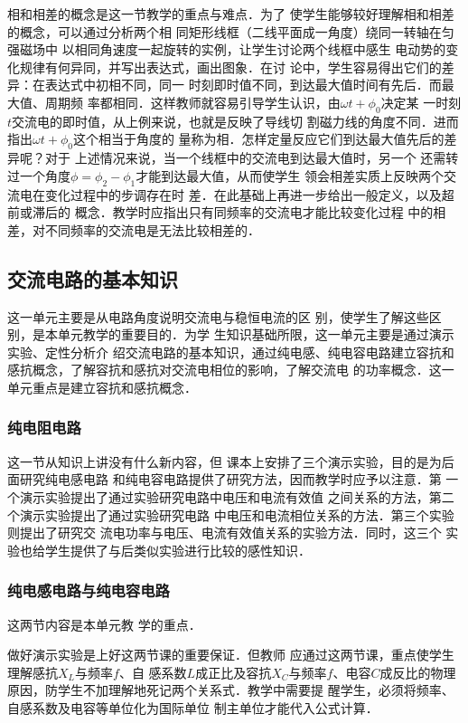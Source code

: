 相和相差的概念是这一节教学的重点与难点．为了
使学生能够较好理解相和相差的概念，可以通过分析两个相
同矩形线框（二线平面成一角度）绕同一转轴在匀强磁场中
以相同角速度一起旋转的实例，让学生讨论两个线框中感生
电动势的变化规律有何异同，并写出表达式，画出图象．在讨
论中，学生容易得出它们的差异：在表达式中初相不同，同一
时刻即时值不同，到达最大值时间有先后．而最大值、周期频
率都相同．这样教师就容易引导学生认识，由$\omega t+\phi_0$决定某
一时刻$t$交流电的即时值，从上例来说，也就是反映了导线切
割磁力线的角度不同．进而指出$\omega t+\phi_0$这个相当于角度的
量称为相．怎样定量反应它们到达最大值先后的差异呢？对于
上述情况来说，当一个线框中的交流电到达最大值时，另一个
还需转过一个角度$\phi=\phi_2-\phi_1$才能到达最大值，从而使学生
领会相差实质上反映两个交流电在变化过程中的步调存在时
差．在此基础上再进一步给出一般定义，以及超前或滞后的
概念．教学时应指出只有同频率的交流电才能比较变化过程
中的相差，对不同频率的交流电是无法比较相差的．


\subsection{交流电路的基本知识}
这一单元主要是从电路角度说明交流电与稳恒电流的区
别，使学生了解这些区别，是本单元教学的重要目的．为学
生知识基础所限，这一单元主要是通过演示实验、定性分析介
绍交流电路的基本知识，通过纯电感、纯电容电路建立容抗和
感抗概念，了解容抗和感抗对交流电相位的影响，了解交流电
的功率概念．这一单元重点是建立容抗和感抗概念．

\subsubsection{纯电阻电路}


 这一节从知识上讲没有什么新内容，但
课本上安排了三个演示实验，目的是为后面研究纯电感电路
和纯电容电路提供了研究方法，因而教学时应予以注意．第
一个演示实验提出了通过实验研究电路中电压和电流有效值
之间关系的方法，第二个演示实验提出了通过实验研究电路
中电压和电流相位关系的方法．第三个实验则提出了研究交
流电功率与电压、电流有效值关系的实验方法．同时，这三个
实验也给学生提供了与后类似实验进行比较的感性知识．

\subsubsection{纯电感电路与纯电容电路}

这两节内容是本单元教
学的重点．

做好演示实验是上好这两节课的重要保证．但教师
应通过这两节课，重点使学生理解感抗$X_L$与频率$f$、自
感系数$L$成正比及容抗$X_C$与频率$f$、电容$C$成反比的物理
原因，防学生不加理解地死记两个关系式．教学中需要提
醒学生，必须将频率、自感系数及电容等单位化为国际单位
制主单位才能代入公式计算．

